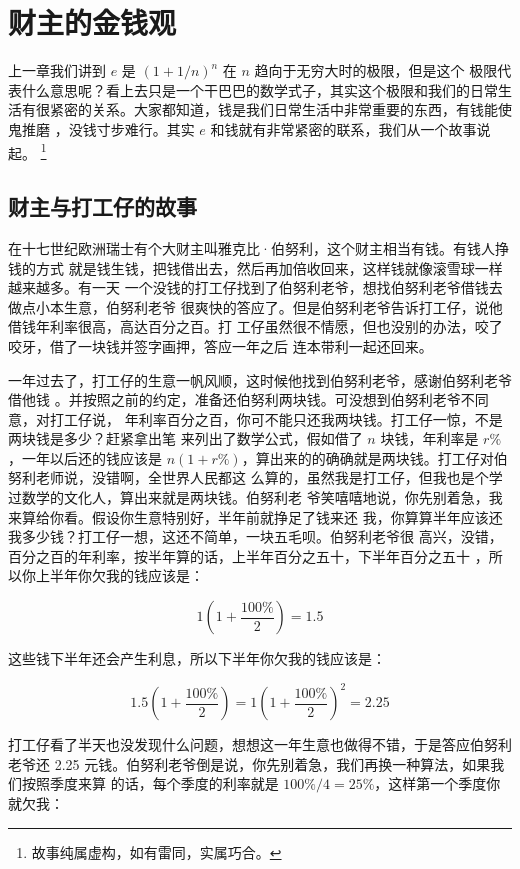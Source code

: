 %

\chapter{财主的金钱观}

上一章我们讲到 $e$ 是 $(1+ 1/n)^n$ 在 $n$ 趋向于无穷大时的极限，但是这个
极限代表什么意思呢？看上去只是一个干巴巴的数学式子，其实这个极限和我们的日常生
活有很紧密的关系。大家都知道，钱是我们日常生活中非常重要的东西，有钱能使鬼推磨
，没钱寸步难行。其实 $e$ 和钱就有非常紧密的联系，我们从一个故事说起。
\footnote{
故事纯属虚构，如有雷同，实属巧合。
}

\section{财主与打工仔的故事}
在十七世纪欧洲瑞士有个大财主叫雅克比·伯努利，这个财主相当有钱。有钱人挣钱的方式
就是钱生钱，把钱借出去，然后再加倍收回来，这样钱就像滚雪球一样越来越多。有一天
一个没钱的打工仔找到了伯努利老爷，想找伯努利老爷借钱去做点小本生意，伯努利老爷
很爽快的答应了。但是伯努利老爷告诉打工仔，说他借钱年利率很高，高达百分之百。打
工仔虽然很不情愿，但也没别的办法，咬了咬牙，借了一块钱并签字画押，答应一年之后
连本带利一起还回来。

一年过去了，打工仔的生意一帆风顺，这时候他找到伯努利老爷，感谢伯努利老爷借他钱
。并按照之前的约定，准备还伯努利两块钱。可没想到伯努利老爷不同意，对打工仔说，
年利率百分之百，你可不能只还我两块钱。打工仔一惊，不是两块钱是多少？赶紧拿出笔
来列出了数学公式，假如借了 $n$ 块钱，年利率是 $r\%$，一年以后还的钱应该是 $n(1
+r\%)$，算出来的的确确就是两块钱。打工仔对伯努利老师说，没错啊，全世界人民都这
么算的，虽然我是打工仔，但我也是个学过数学的文化人，算出来就是两块钱。伯努利老
爷笑嘻嘻地说，你先别着急，我来算给你看。假设你生意特别好，半年前就挣足了钱来还
我，你算算半年应该还我多少钱？打工仔一想，这还不简单，一块五毛呗。伯努利老爷很
高兴，没错，百分之百的年利率，按半年算的话，上半年百分之五十，下半年百分之五十
，所以你上半年你欠我的钱应该是：

$$ 1(1+ \frac {100\%} {2})=1.5 $$

这些钱下半年还会产生利息，所以下半年你欠我的钱应该是：

$$ 1.5(1+ \frac {100\%} {2} ) = 1(1+ \frac {100\%} {2})^2 = 2.25 $$

打工仔看了半天也没发现什么问题，想想这一年生意也做得不错，于是答应伯努利老爷还
2.25 元钱。伯努利老爷倒是说，你先别着急，我们再换一种算法，如果我们按照季度来算
的话，每个季度的利率就是 $ 100\% / 4 = 25\% $，这样第一个季度你就欠我：

